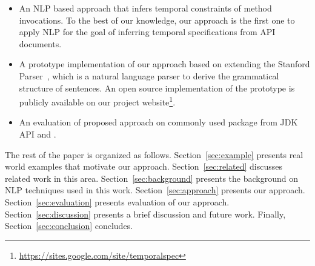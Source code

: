 \begin{itemize}
	\item An NLP based approach that infers temporal constraints of method invocations. 
	To the best of our knowledge, our approach is the first one to apply NLP for the goal of inferring temporal specifications from API documents.
	\item A prototype implementation of our approach based on extending the Stanford Parser~\cite{Klein03}, which is a natural language parser to derive the grammatical structure of sentences.
	An open source implementation of the prototype is publicly available on our project website\footnote{\url{https://sites.google.com/site/temporalspec}}. 
	\item An evaluation of proposed approach on commonly used package  from JDK API and \amazonAPI. 
\end{itemize}


The rest of the paper is organized as follows.
Section~\ref{sec:example} presents real world examples that motivate our approach.
Section~\ref{sec:related} discusses related work in this area.
Section~\ref{sec:background} presents the  background on NLP techniques used in this work.
Section~\ref{sec:approach} presents our approach.
Section~\ref{sec:evaluation} presents evaluation of our approach.
Section~\ref{sec:discussion} presents a brief discussion and future work.
Finally, Section~\ref{sec:conclusion} concludes.


